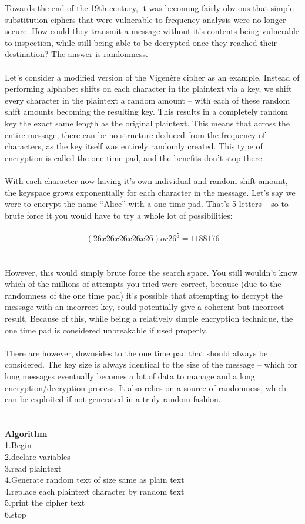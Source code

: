 \documentclass[11pt]{article}
\begin{document}
Towards the end of the 19th century, it was becoming fairly obvious that simple substitution ciphers that were vulnerable to frequency analysis were no longer secure. How could they transmit a message without it’s contents being vulnerable to inspection, while still being able to be decrypted once they reached their destination? The answer is randomness.
\\
\\
Let’s consider a modified version of the Vigenère cipher as an example. Instead of performing alphabet shifts on each character in the plaintext via a key, we shift every character in the plaintext a random amount – with each of these random shift amounts becoming the resulting key. This results in a completely random key the exact same length as the original plaintext. This means that across the entire message, there can be no structure deduced from the frequency of characters, as the key itself was entirely randomly created. This type of encryption is called the one time pad, and the benefits don’t stop there.
\\
\\
With each character now having it’s own individual and random shift amount, the keyspace grows exponentially for each character in the message. Let’s say we were to encrypt the name “Alice” with a one time pad. That’s 5 letters – so to brute force it you would have to try a whole lot of possibilities:
\\
\\
$$(26x26x26x26x26) or 26^5 = 1188176$$
\\
\\
However, this would simply brute force the search space. You still wouldn't know which of the millions of attempts you tried were correct, because (due to the randomness of the one time pad) it's possible that attempting to decrypt the message with an incorrect key, could potentially give a coherent but incorrect result. Because of this, while being a relatively simple encryption technique, the one time pad is considered unbreakable if used properly.
\\
\\
There are however, downsides to the one time pad that should always be considered. The key size is always identical to the size of the message – which for long messages eventually becomes a lot of data to manage and a long encryption/decryption process. It also relies on a source of randomness, which can be exploited if not generated in a truly random fashion.
\\
\\
\\
\textbf{Algorithm}
\\
1.Begin\\
2.declare variables\\
3.read plaintext\\
4.Generate random text of size same as plain text\\
4.replace each plaintext character by random text\\
5.print the cipher text\\
6.stop\\
\\
\\
\end{document}
